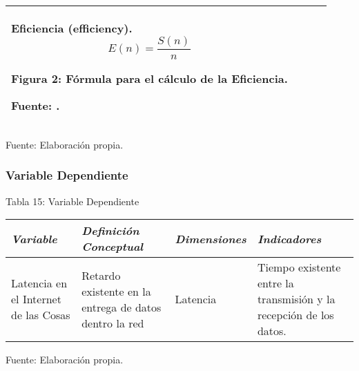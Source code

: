\begin{table}[h!]
\begin{tabular}{|p{3cm}|p{3cm}|p{3cm}|p{4cm}|}
                Eficiencia (efficiency). 
                \begin{equation*}\label{}
                    E(n) = \frac{S(n)}{n}                   
                \end{equation*}                
                \begin{center}
                    { Figura 2: Fórmula para el cálculo de la Eficiencia.}\par
                    { Fuente: {\cite{rafael2009}}. }                       
                \end{center}
                \\ \hline

                \end{tabular}
                \begin{center}
                    \vskip -0.2cm
                    {\small{Fuente: Elaboración propia.}}
                \end{center}
            \end{table}
        \subsubsection{Variable Dependiente}
            \begin{table}[h!]
                \centering
                { Tabla 15: Variable Dependiente}\par
                \begin{tabular}{|p{3cm}|p{3cm}|p{3cm}|p{3cm}|} \hline
                    
                
                \textit{{\bf{Variable}}} &
                \textit{{\bf{Definición Conceptual}}} &
                \textit{{\bf{Dimensiones}}} &
                \textit{{\bf{Indicadores}}}
                \\ \hline

                Latencia en el Internet de las Cosas &
                Retardo existente en la entrega de datos dentro la red &
                Latencia &
                Tiempo existente entre la transmisión y la recepción de los datos. 
                \\ \hline

                \end{tabular}
                \begin{center}
                    \vskip -0.2cm
                    {\small{Fuente: Elaboración propia.}}
                \end{center}
            \end{table}
